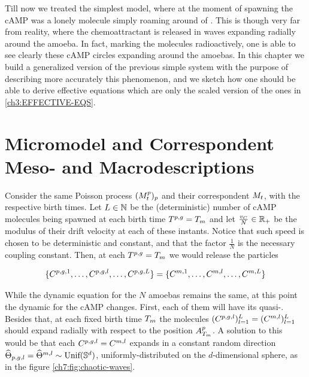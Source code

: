 \label{ch7}

Till now we treated the simplest model, where at the moment of spawning the cAMP was a lonely molecule simply roaming around of \Bm.
This is though very far from reality, where the chemoattractant is released in waves expanding radially around the amoeba.
In fact, marking the molecules radioactively, one is able to see clearly these cAMP circles expanding around the amoebas.
In this chapter we build a generalized version of the previous simple system with the purpose of describing more accurately this phenomenon, and we sketch how one should be able to derive effective equations which are only the scaled version of the ones in \ref{ch3:EFFECTIVE-EQS}.

\section{Micromodel and Correspondent Meso- and Macrodescriptions}


Consider the same Poisson process $(M_t^p)_p$ and their correspondent $M_t$, with the respective birth times.
Let $L \in \mathbb{N}$ be the (deterministic) number of cAMP molecules being spawned at each birth time $T^{p,g}=T_m$ and let $\frac{v_C}{N} \in \mathbb{R}_+$ be the modulus of their drift velocity at each of these instants.
Notice that such speed is chosen to be deterministic and constant, and that the factor $\frac{1}{N}$ is the necessary coupling constant.
Then, at each $T^{p,g}=T_m$ we would release the particles

\begin{equation*}
	\{ C^{p,g,1}, \ldots, C^{p,g,l}, \ldots, C^{p,g,L}\} = \{ C^{m,1}, \ldots, C^{m,l},\ldots, C^{m,L}\} 
\end{equation*}

While the dynamic equation for the $N$ amoebas remains the same, at this point the dynamic for the cAMP changes.
First, each of them will have its quasi-\Bm.
Besides that, at each fixed birth time $T_m$ the molecules $(C^{p,g,l})_{l=1}^L = (C^{m,l})_{l=1}^L$ should expand radially with respect to the position $A_{T_m}^p$.
A solution to this would be that each $C^{p,g,l} = C^{m,l}$ expands in a constant random direction $\widehat{\Theta}_{p,g,l}=\widehat{\Theta}^{m,l} \sim \text{Unif}(\mathbb{S}^d)$, \ie uniformly-distributed on the $d$-dimensional sphere, as in the figure \ref{ch7:fig:chaotic-waves}.

